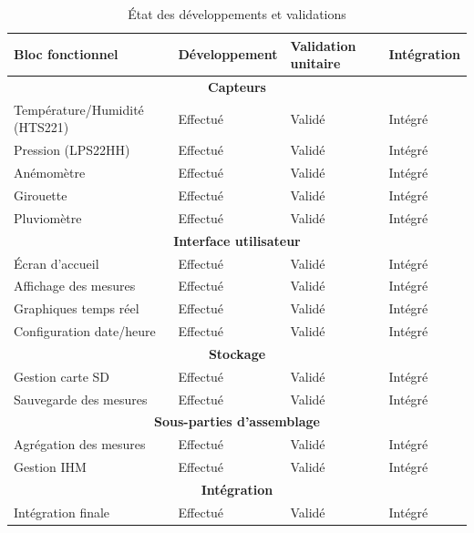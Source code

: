 \documentclass[12pt]{article}
\begin{document}
\begin{table}[htbp]
    \centering
    \caption{État des développements et validations}
    \begin{tabular}{|p{}|p{}|p{}|p{}|}
        \hline
        \textbf{Bloc fonctionnel} & \textbf{Développement} & \textbf{Validation unitaire} & \textbf{Intégration} \\
        \hline
        \multicolumn{4}{|c|}{\textbf{Capteurs}} \\
        \hline
        Température/Humidité (HTS221) & Effectué & Validé & Intégré \\
        \hline
        Pression (LPS22HH) & Effectué & Validé & Intégré \\
        \hline
        Anémomètre & Effectué & Validé & Intégré \\
        \hline
        Girouette & Effectué & Validé & Intégré \\
        \hline
        Pluviomètre & Effectué & Validé & Intégré \\
        \hline
        \multicolumn{4}{|c|}{\textbf{Interface utilisateur}} \\
        \hline
        Écran d'accueil & Effectué & Validé & Intégré \\
        \hline
        Affichage des mesures & Effectué & Validé & Intégré \\
        \hline
        Graphiques temps réel & Effectué & Validé & Intégré \\
        \hline
        Configuration date/heure & Effectué & Validé & Intégré \\
        \hline
        \multicolumn{4}{|c|}{\textbf{Stockage}} \\
        \hline
        Gestion carte SD & Effectué & Validé & Intégré \\
        \hline
        Sauvegarde des mesures & Effectué & Validé & Intégré \\
        \hline
        \multicolumn{4}{|c|}{\textbf{Sous-parties d'assemblage}} \\
        \hline
        Agrégation des mesures & Effectué & Validé & Intégré \\
        \hline
        Gestion IHM & Effectué & Validé & Intégré \\
        \hline
        \multicolumn{4}{|c|}{\textbf{Intégration}} \\
        \hline
        Intégration finale & Effectué & Validé & Intégré \\
        \hline
    \end{tabular}
\end{table}
\end{document}
